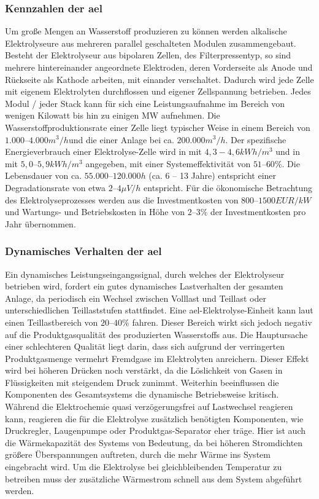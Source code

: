 \documentclass[onecolumn,10pt,titlepage]{article}
\begin{document}
			\subsubsection*{Kennzahlen der \gls{ael}}	
			Um große Mengen an Wasserstoff produzieren zu können werden alkalische Elektrolyseure aus mehreren parallel geschalteten Modulen zusammengebaut. Besteht der Elektrolyseur aus bipolaren Zellen, des Filterpressentyp, so sind mehrere hintereinander angeordnete Elektroden, deren Vorderseite als Anode und Rückseite als Kathode arbeiten, mit einander verschaltet.\cite{Kurzweil.2015} Dadurch wird jede Zelle mit eigenem Elektrolyten durchflossen und eigener Zellspannung betrieben. Jedes Modul / jeder Stack kann für sich eine Leistungsaufnahme im Bereich von wenigen Kilowatt bis hin zu einigen MW aufnehmen.\cite{Smolinka.05.07.2011}  Die Wasserstoffproduktionsrate einer Zelle liegt typischer Weise in einem Bereich von $1.000–4.000 m^3/h$und die einer Anlage bei ca. $200.000 m^3/h$.\cite{Kurzweil.2015} Der spezifische Energieverbrauch einer Elektrolyse-Zelle wird in \cite{Kurzweil.2015} mit $4,3-4,6 kWh/m^3$ und in \cite{Buttler.2018} mit $5,0–5,9 kWh/m^3$ angegeben, mit einer Systemeffektivität von $51–60\%$. Die Lebensdauer von ca. $55.000–120.000h$ (ca. 6 – 13 Jahre) entspricht einer Degradationsrate von etwa $2–4 \mu V/h$ entspricht.\cite{Buttler.2018} Für die ökonomische Betrachtung des Elektrolyseprozesses werden aus \cite{Buttler.2018} die Investmentkosten von $800 – 1500 EUR/kW$ und Wartungs- und Betriebskosten in Höhe von $2 – 3 \%$ der Investmentkosten pro Jahr übernommen. 
			\subsubsection*{Dynamisches Verhalten der \gls{ael}}	
			Ein dynamisches Leistungseingangssignal, durch welches der Elektrolyseur betrieben wird, fordert ein gutes dynamisches Lastverhalten der gesamten Anlage, da periodisch ein Wechsel zwischen Volllast und Teillast oder unterschiedlichen Teillaststufen stattfindet. Eine \gls{ael}-Elektrolyse-Einheit kann laut \cite{Smolinka.05.07.2011} einen Teillastbereich von $20–40 \%$ fahren. Dieser Bereich wirkt sich jedoch negativ auf die Produktgasqualität des produzierten Wasserstoffs aus. Die Hauptursache einer schlechteren Qualität liegt darin, dass sich aufgrund der verringerten Produktgasmenge vermehrt Fremdgase im Elektrolyten anreichern. Dieser Effekt wird bei höheren Drücken noch verstärkt, da die Löslichkeit von Gasen in Flüssigkeiten mit steigendem Druck zunimmt. Weiterhin beeinflussen die Komponenten des Gesamtsystems die dynamische Betriebsweise kritisch. Während die Elektrochemie quasi verzögerungsfrei auf Lastwechsel reagieren kann, reagieren die für die Elektrolyse zusätzlich benötigten Komponenten, wie Druckregler, Laugenpumpe oder Produktgas-Separator eher träge. Hier ist auch die Wärmekapazität des Systems von Bedeutung, da bei höheren Stromdichten größere Überspannungen auftreten, durch die mehr Wärme ins System eingebracht wird. Um die Elektrolyse bei gleichbleibenden Temperatur zu betreiben muss der zusätzliche Wärmestrom schnell aus dem System abgeführt werden. 
			
\end{document}
